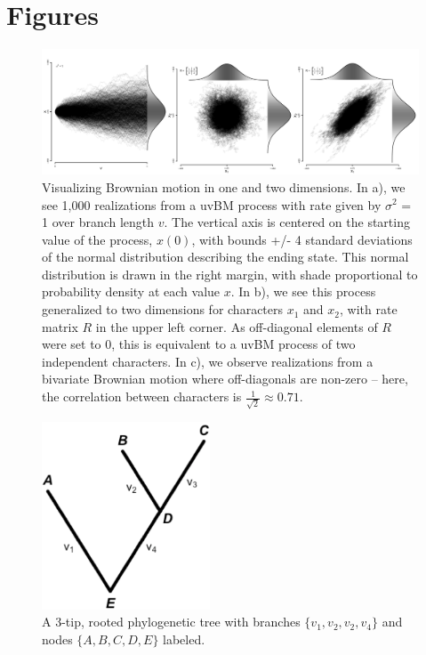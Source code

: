 \documentclass[10pt, twocolumn, twoside]{article}
\begin{document}
\clearpage
\onecolumn

\section{Figures}

\begin{figure}[h]
\centering
\includegraphics[width=160mm]{figures/unibivariateBMseed24.png}
\caption[Visualizing Brownian Motion in One and Two Dimensions]{Visualizing Brownian motion in one and two dimensions. In a), we see 1,000 realizations from a uvBM process with rate given by $\sigma^2$ = 1 over branch length $v$. The vertical axis is centered on the starting value of the process, $x(0)$, with bounds +/- 4 standard deviations of the normal distribution describing the ending state. This normal distribution is drawn in the right margin, with shade proportional to probability density at each value $x$. In b), we see this process generalized to two dimensions for characters $x_1$ and $x_2$, with rate matrix $R$ in the upper left corner. As off-diagonal elements of $R$ were set to 0, this is equivalent to a uvBM process of two independent characters. In c), we observe realizations from a bivariate Brownian motion where off-diagonals are non-zero -- here, the correlation between characters is $\frac{1}{\sqrt{2}} \approx 0.71$. 
\label{overflow}
\label{fig:univBM}
}
\end{figure}

\begin{figure}[t]
\centering
\includegraphics[width=50mm]{figures/simple3tiptree.png}
\caption[A Simple Rooted Tree with Three Tips]{A 3-tip, rooted phylogenetic tree with branches $\{v_1, v_2, v_2, v_4\}$ and nodes $\{A, B, C, D, E\}$ labeled. 
\label{overflow}
\label{fig:simpleTree}
}
\end{figure}
\end{document}
